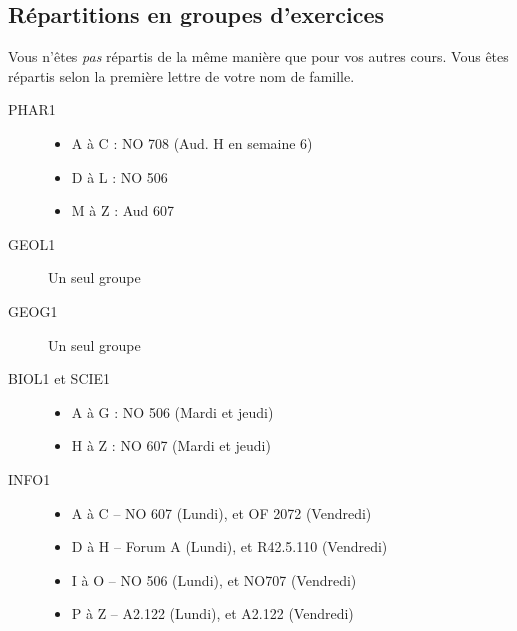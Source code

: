 \documentclass[french,xcolor=svgnames]{beamer}
\begin{document}
\subsection{Répartitions en groupes d'exercices}
\begin{frame}
  \begin{remark*}
    Vous n'êtes \emph{pas} répartis de la même manière que pour vos autres cours.
    Vous êtes répartis selon la première lettre de votre nom de famille.
  \end{remark*}
  \begin{description}
  \item[PHAR1]
    \begin{itemize}
    \item A à C : NO 708 (Aud. H en semaine 6)
    \item D à L : NO 506
    \item M à Z : Aud 607
    \end{itemize}
  \item[GEOL1] Un seul groupe
  \item[GEOG1] Un seul groupe
  \item[BIOL1 et SCIE1] 
    \begin{itemize}
    \item A à G : NO 506 (Mardi et jeudi)
    \item H à Z : NO 607 (Mardi et jeudi)
    \end{itemize}
  \item[INFO1]
    \begin{itemize}
    \item A à C -- NO 607 (Lundi), et OF 2072 (Vendredi)
    \item D à H -- Forum A (Lundi), et R42.5.110 (Vendredi)
    \item I à O -- NO 506 (Lundi), et NO707 (Vendredi)
    \item P à Z -- A2.122 (Lundi), et A2.122 (Vendredi)
    \end{itemize}
  \end{description}
\end{frame}
\end{document}
